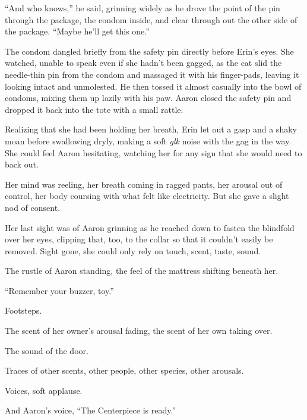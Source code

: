 ``And who knows,'' he said, grinning widely as he drove the point of the pin through the package, the condom inside, and clear through out the other side of the package. ``Maybe he'll get this one.''

The condom dangled briefly from the safety pin directly before Erin's eyes. She watched, unable to speak even if she hadn't been gagged, as the cat slid the needle-thin pin from the condom and massaged it with his finger-pads, leaving it looking intact and unmolested. He then tossed it almost casually into the bowl of condoms, mixing them up lazily with his paw. Aaron closed the safety pin and dropped it back into the tote with a small rattle.

Realizing that she had been holding her breath, Erin let out a gasp and a shaky moan before swallowing dryly, making a soft \emph{glk} noise with the gag in the way. She could feel Aaron hesitating, watching her for any sign that she would need to back out.

Her mind was reeling, her breath coming in ragged pants, her arousal out of control, her body coursing with what felt like electricity. But she gave a slight nod of consent.

Her last sight was of Aaron grinning as he reached down to fasten the blindfold over her eyes, clipping that, too, to the collar so that it couldn't easily be removed. Sight gone, she could only rely on touch, scent, taste, sound.

The rustle of Aaron standing, the feel of the mattress shifting beneath her.

``Remember your buzzer, toy.''

Footsteps.

The scent of her owner's arousal fading, the scent of her own taking over.

The sound of the door.

Traces of other scents, other people, other species, other arousals.

Voices, soft applause.

And Aaron's voice, ``The Centerpiece is ready.''
